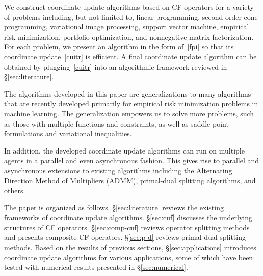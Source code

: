We construct coordinate update algorithms based on CF operators for a variety of problems including, but not limited to, linear programming, second-order cone programming, variational image processing, support vector machine, empirical risk minimization, portfolio optimization, and nonnegative matrix factorization. For each problem, we present an algorithm in the form of~\eqref{fpi} so that its coordinate update~\eqref{cuitr} is efficient. A final coordinate update algorithm can be obtained by plugging~\eqref{cuitr} into an algorithmic framework reviewed in \S\ref{sec:literature}.

The algorithms developed in this paper are generalizations to many algorithms that are recently developed primarily for empirical risk minimization problems in machine learning. %
The generalization empowers us to solve more problems, such as those with multiple functions and constraints, as well as saddle-point formulations and variational inequalities.


In addition, the developed coordinate update algorithms can run on multiple agents in a parallel and even asynchronous fashion. This gives rise to parallel and asynchronous extensions to  existing algorithms including the Alternating Direction Method of Multipliers (ADMM), primal-dual splitting algorithms, and others.

The paper is organized as follows. \S\ref{sec:literature} reviews the existing frameworks of coordinate update algorithms. \S\ref{sec:cuf} discusses the underlying structures of CF operators. \S\ref{sec:comp-cuf} reviews operator splitting methods and presents composite CF operators. \S\ref{sec:p-d} reviews primal-dual splitting methods. Based on the results of previous sections, \S\ref{sec:applications} introduces coordinate update algorithms for various applications, some of which have been tested with numerical results presented in \S\ref{sec:numerical}.

